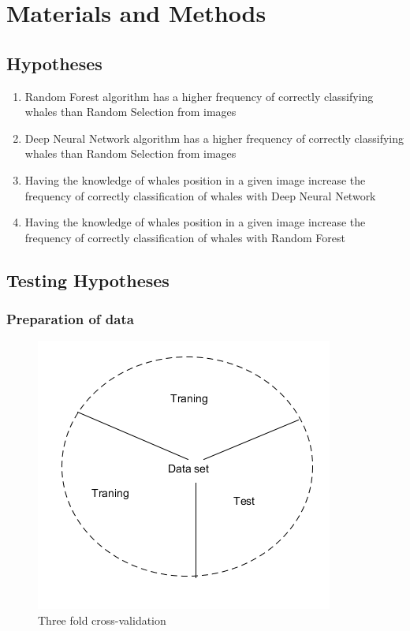 \section{Materials and Methods}
\subsection{Hypotheses}
\begin{enumerate}
\item Random Forest algorithm has a higher frequency of correctly classifying whales than Random Selection from images
\item Deep Neural Network algorithm has a higher frequency of correctly classifying whales than Random Selection from images
\item Having the knowledge of whales position in a given image increase the frequency of correctly classification of whales with Deep Neural Network
\item Having the knowledge of whales position in a given image increase the frequency of correctly classification of whales with Random Forest
\end{enumerate}


\subsection{Testing Hypotheses}

\subsubsection{Preparation of data}
\begin{figure}
\label{fig:crossvalidation}
\centering
\includegraphics[scale=0.5]{images/3FoldCrossValidation}
\caption{Three fold cross-validation}
\end{figure}

